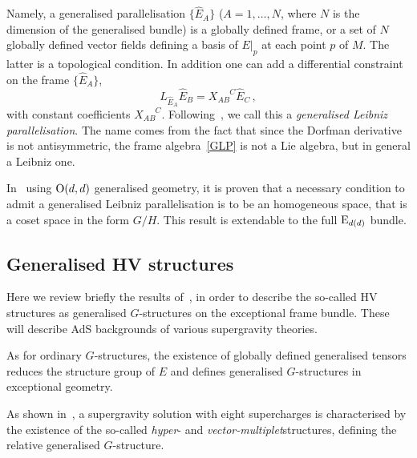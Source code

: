 \documentclass[debug]{phd}
\begin{document}
					Namely, a generalised parallelisation $\{\hat{E}_A\}$ ($A = 1, \ldots , N$, where $N$ is the dimension of the generalised bundle) is a globally defined frame, or a set of $N$ globally defined vector fields defining a basis of $E\vert_p$ at each point $p$ of $M$.
The latter is a topological condition.
					In addition one can add a differential constraint on the frame $\{\hat{E}_A\}$, 
							\begin{equation}\label{GLP}
								L_{\hat{E}_A} \hat{E}_B = X_{AB}^{\phantom{AB}C} \hat{E}_C \, ,
							\end{equation}
					with constant coefficients $X_{AB}^{\phantom{AB}C}$.
					Following~\cite{spheres}, we call this a \emph{generalised Leibniz parallelisation}.
					The name comes from the fact that since the Dorfman derivative is not antisymmetric, the frame algebra~\eqref{GLP} is not a Lie algebra, but in general a Leibniz one.
					
					In~\cite{petrini3} using $\mathrm{O}(d,d)$ generalised geometry, it is proven that a necessary condition to admit a generalised Leibniz parallelisation is to be an homogeneous space, that is a coset space in the form $G/H$.
					This result is extendable to the full $\mathrm{E}_{d(d)}$ bundle.
					
%					
			\subsection{Generalised HV structures}\label{sec:ESE}
					Here we review briefly the results of~\cite{AshmoreESE}, in order to describe the so-called HV structures as generalised $G$-structures on the exceptional frame bundle.
					These will describe AdS backgrounds of various supergravity theories.
					
					As for ordinary $G$-structures, the existence of globally defined generalised tensors reduces the structure group of $E$ and defines generalised $G$-structures in exceptional geometry.
					
					As shown in~\cite{AshmoreESE, AshmoreECY, Grana_Ntokos}, a supergravity solution with eight supercharges is characterised by the existence of the so-called \emph{hyper}- and \emph{vector-multiplet}structures, defining the relative generalised $G$-structure.
					
\end{document}
